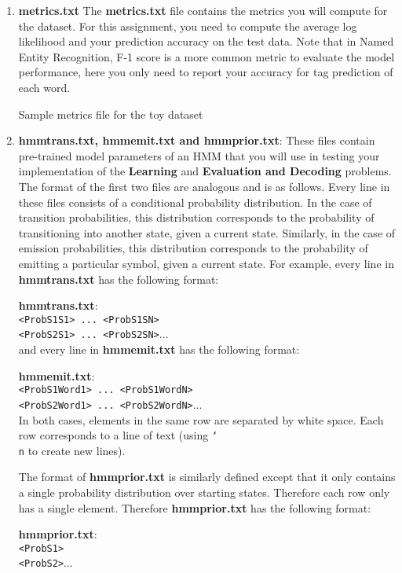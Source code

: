 \documentclass[11pt,addpoints,answers]{exam}
\numberwithin{equation}{section} %
\numberwithin{figure}{section} %
\numberwithin{table}{section} %
\begin{document}
\begin{enumerate}
\item \textbf{metrics.txt} The \textbf{metrics.txt} file contains the metrics you will compute for the dataset. For this assignment, you need to compute the average log likelihood and your prediction accuracy on the test data. Note that in Named Entity Recognition, F-1 score is a more common metric to evaluate the model performance, here you only need to report your accuracy for tag prediction of each word. 

Sample metrics file for the toy dataset


\item \textbf{hmmtrans.txt, hmmemit.txt and hmmprior.txt}: These files contain pre-trained model parameters of an HMM that you will use in testing your implementation of the \textbf{Learning} and \textbf{Evaluation and Decoding} problems. The format of the first two files are analogous and is as follows. Every line in these files consists of a conditional probability distribution. In the case of transition probabilities, this distribution corresponds to the probability of transitioning into another state, given a current state. Similarly, in the case of emission probabilities, this distribution corresponds to the probability of emitting a particular symbol, given a current state. For example, every line in \textbf{hmmtrans.txt} has the following format:

    \textbf{hmmtrans.txt}:\\
    \texttt{<ProbS1S1> ... <ProbS1SN>}\\
     \texttt{<ProbS2S1> ... <ProbS2SN>}...\\   

and every line in \textbf{hmmemit.txt} has the following format:

    \textbf{hmmemit.txt}:\\
    \texttt{<ProbS1Word1> ... <ProbS1WordN>}\\
     \texttt{<ProbS2Word1> ... <ProbS2WordN>}...\\

In both cases, elements in the same row are separated by white space. Each row corresponds to a line of text (using \texttt{\char`\\ n} to create new lines).

    
The format of \textbf{hmmprior.txt} is similarly defined except that it only contains a single probability distribution over starting states. Therefore each row only has a single element. Therefore \textbf{hmmprior.txt} has the following format:

    \textbf{hmmprior.txt}:\\
    \texttt{<ProbS1>}\\
     \texttt{<ProbS2>}...\\

\end{enumerate}
\end{document}
